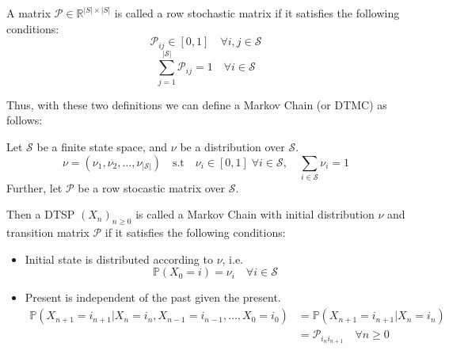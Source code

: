 \begin{definition}
    A matrix \(\mathcal{P} \in \mathbb{R}^{|S| \times |S|}\) is called a row stochastic matrix if
    it satisfies the following conditions:
    \[
        \mathcal{P} _{ij} \in [0, 1] \quad \forall i, j \in \mathcal{S}  
    \]
    \[
        \sum\limits_{j = 1 }^{ |\mathcal{S}|} \mathcal{P} _{ij} = 1 \quad \forall i \in \mathcal{S}  
    \]
\end{definition}
Thus, with these two definitions we can define a Markov Chain (or DTMC) as follows:
\begin{definition}
    Let \(\mathcal{S} \) be a finite state space, and \(\nu\) be a distribution over \(\mathcal{S} \).
    \[
        \nu = (\nu _{1}, \nu _{2}, \dots, \nu _{|\mathcal{S}|}) \quad
        \text{s.t} \quad \nu _{i} \in [0, 1] \; \forall i \in \mathcal{S},
        \quad \sum\limits_{i \in \mathcal{S} } \nu _{i} = 1
    \]  
    Further, let \(\mathcal{P} \) be a row stocastic matrix over \(\mathcal{S} \).
    
    Then a DTSP \({(X_n)}_{n \geq 0}\) is called a Markov Chain with initial distribution \(\nu \)
    and transition matrix \(\mathcal{P} \) if it satisfies the following conditions:
    \begin{itemize}
        \item Initial state is distributed according to \(\nu \), i.e.
        \[
            \mathbb{P}(X_0 = i) = \nu _{i} \quad \forall i \in \mathcal{S}    
        \]
        \item Present is independent of the past given the present.
        \[
            \begin{aligned}
                \mathbb{P} \left( 
                    X_{n+1} = i_{n+1} | X_{n} = i_{n}, X_{n-1} = i_{n-1}, \dots, X_{0} = i_{0}
                 \right) &= \mathbb{P} \left( 
                     X_{n+1} = i_{n+1} | X_{n} = i_{n}
                  \right) \\
                    & = \mathcal{P}_{i_{n} i_{n+1}} \quad \forall n \geq 0
            \end{aligned}
        \]
    \end{itemize}
\end{definition}

